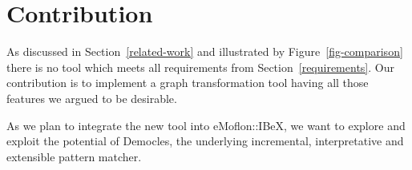 \section{Contribution}
\label{contribution}
As discussed in Section~\ref{related-work} and illustrated by Figure~\ref{fig-comparison} there is no tool which meets all requirements from Section~\ref{requirements}.
Our contribution is to implement a graph transformation tool having all those features we argued to be desirable.

As we plan to integrate the new tool into eMoflon::IBeX, we want to explore and exploit the potential of Democles, the underlying incremental, interpretative and extensible pattern matcher.
